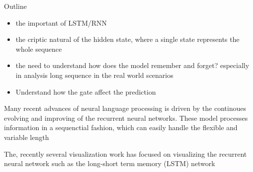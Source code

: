 Outline
\begin{itemize}
    \item the important of LSTM/RNN
    \item the criptic natural of the hidden state, where a single state represents the whole sequence
    \item the need to understand how does the model remember and forget? especially in analysis long sequence in the real world scenarios
    \item Understand how the gate affect the prediction
\end{itemize}

Many recent advances of neural language processing is driven by the continoues evolving and improving of the recurrent neural networks. These model processes information in a sequenctial fashion, which can easily handle the flexible and variable length


The, recently several visualization work has focused on visualizing the recurrent neural network such as the long-short term memory (LSTM) network
